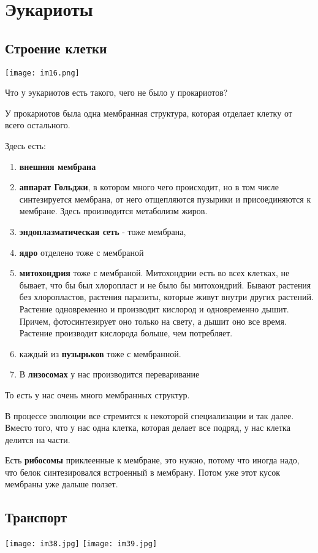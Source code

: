 ﻿\section{Эукариоты}

\subsection{Строение клетки}
\texttt{[image: im16.png]}

Что у эукариотов есть такого, чего не было у прокариотов? 

У прокариотов была одна мембранная структура, которая отделает клетку от 
всего остального. 

Здесь есть: 
\begin{enumerate}
\item \textbf{внешняя мембрана}
\item \textbf{аппарат Гольджи}, в котором много чего происходит, но в том числе синтезируется мембрана, от него отщепляются пузырики и присоединяются
к мембране. Здесь производится метаболизм жиров. 
\item \textbf{эндоплазматическая сеть} - тоже мембрана, 
\item \textbf{ядро} отделено тоже с мембраной 
\item \textbf{митохондрия} тоже с мембраной. Митохондрии есть во всех клетках, не бывает, что бы 
был хлоропласт и не было бы митохондрий. Бывают растения без хлоропластов, 
растения паразиты, которые живут внутри других растений. Растение одновременно и 
производит кислород и одновременно дышит. Причем, фотосинтезирует оно только на 
свету, а дышит оно все время. Растение производит кислорода больше, чем потребляет. 
\item каждый из \textbf{пузырьков} тоже с мембранной. 
\item В \textbf{лизосомах} у нас производится переваривание
\end{enumerate}
То есть у нас очень много мембранных структур. 

В процессе эволюции все стремится к некоторой специализации и так далее. 
Вместо того, что у нас одна клетка, 
которая делает все подряд, у нас клетка делится на части.

Есть \textbf{рибосомы} приклеенные к мембране, это нужно, потому что иногда надо, 
что белок синтезировался встроенный в мембрану. Потом уже этот 
кусок мембраны уже дальше ползет. 

\subsection{Транспорт}
\texttt{[image: im38.jpg]}
\texttt{[image: im39.jpg]}

